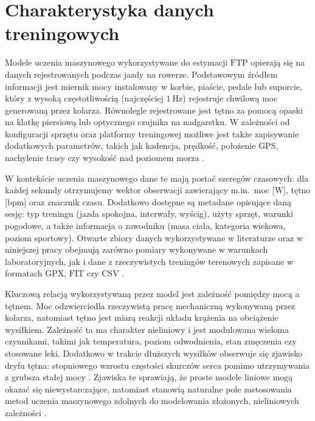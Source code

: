 \section{Charakterystyka danych treningowych}

Modele uczenia maszynowego wykorzystywane do estymacji $\mathrm{FTP}$ opierają się na danych rejestrowanych podczas jazdy na rowerze.
Podstawowym źródłem informacji jest miernik mocy instalowany w korbie, piaście, pedale lub suporcie, który z wysoką częstotliwością (najczęściej $1\ \mathrm{Hz}$) rejestruje chwilową moc generowaną przez kolarza.
Równolegle rejestrowane jest tętno za pomocą opaski na klatkę piersiową lub optycznego czujnika na nadgarstku.
W zależności od konfiguracji sprzętu oraz platformy treningowej możliwe jest także zapisywanie dodatkowych parametrów, takich jak kadencja, prędkość, położenie GPS, nachylenie trasy czy wysokość nad poziomem morza \parencite{allen2019power,phasescycling2023_ftp_variability,kaggle_redlineracer_road_cycling_performance_testing,osf_goldencheetah_opendata}.

W kontekście uczenia maszynowego dane te mają postać szeregów czasowych: dla każdej sekundy otrzymujemy wektor obserwacji zawierający m.in.\ moc [$\mathrm{W}$], tętno [$\mathrm{bpm}$] oraz znacznik czasu.
Dodatkowo dostępne są metadane opisujące daną sesję: typ treningu (jazda spokojna, interwały, wyścig), użyty sprzęt, warunki pogodowe, a także informacja o zawodniku (masa ciała, kategoria wiekowa, poziom sportowy).
Otwarte zbiory danych wykorzystywane w literaturze oraz w niniejszej pracy obejmują zarówno pomiary wykonywane w warunkach laboratoryjnych, jak i dane z rzeczywistych treningów terenowych zapisane w formatach $\mathrm{GPX}$, $\mathrm{FIT}$ czy $\mathrm{CSV}$ \parencite{kaggle_redlineracer_road_cycling_performance_testing,osf_goldencheetah_opendata,stockwell2023mlftp}.

Kluczową relacją wykorzystywaną przez model jest zależność pomiędzy mocą a tętnem.
Moc odzwierciedla rzeczywistą pracę mechaniczną wykonywaną przez kolarza, natomiast tętno jest miarą reakcji układu krążenia na obciążenie wysiłkiem.
Zależność ta ma charakter nieliniowy i jest modulowana wieloma czynnikami, takimi jak temperatura, poziom odwodnienia, stan zmęczenia czy stosowane leki.
Dodatkowo w trakcie dłuższych wysiłków obserwuje się zjawisko dryfu tętna: stopniowego wzrostu częstości skurczów serca pomimo utrzymywania z grubsza stałej mocy \parencite{borszcz2018ftp,karsten2021cpftp}.
Zjawiska te sprawiają, że proste modele liniowe mogą okazać się niewystarczające, natomiast stanowią naturalne pole zastosowania metod uczenia maszynowego zdolnych do modelowania złożonych, nieliniowych zależności \parencite{stockwell2023mlftp,denham2020predictftp}.

